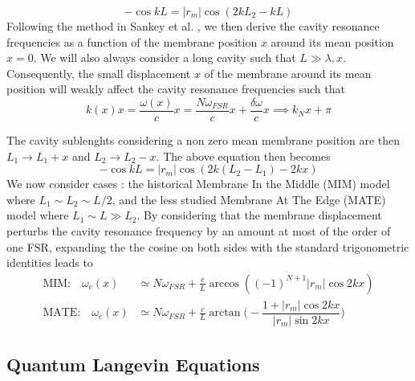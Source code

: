\begin{equation}
  -\cos kL = |r_m|\cos (2kL_2 - kL)
\end{equation}
Following the method in Sankey et al. \cite{sankey_strong_2010}, we then derive the cavity resonance frequencies as a function of the membrane position \(x\) around its mean position \(x=0\). We will also always consider a long cavity such that \( L \gg \lambda,x \). Consequently, the small displacement \(x\) of the membrane around its mean position will weakly affect the cavity resonance frequencies such that 
\begin{equation}
  k(x)x = \dfrac{\omega(x)}{c} x = \dfrac{N\omega_{FSR}}{c}x + \dfrac{\delta\omega}{c}x  \implies k_N x + \pi 
\end{equation}


The cavity sublenghts considering a non zero mean membrane position are then \(L_1 \rightarrow L_1 +  x\) and \(L_2 \rightarrow L_2 -  x\). The above equation then becomes
\begin{equation}
  -\cos kL = |r_m|\cos (2k(L_2 - L_1) - 2kx ) 
\end{equation}
We now consider cases : the historical Membrane In the Middle (MIM) model where $L_1 \sim L_2 \sim L/2$, and the less studied Membrane At The Edge (MATE) model where $L_1 \sim L \gg L_2$. By considering that the membrane displacement perturbs the cavity resonance frequency by an amount at most of the order of one FSR, expanding the the cosine on both sides with the standard trigonometric identities leads to     
\begin{equation}
  \begin{split}
    \text{MIM:} \quad \omega_c(x) & \simeq N \omega_{FSR} + \frac{c}{L} \arccos( (-1)^{N+1}|r_m| \cos 2 k  x) \\
    \text{MATE:} \quad \omega_c(x) & \simeq N \omega_{FSR} + \frac{c}{L} \arctan \Bigg( -  \dfrac{1 + |r_m|\cos 2 k  x}{|r_m|\sin 2kx} \Bigg)
  \end{split}
\end{equation}

\subsection{Quantum Langevin Equations}

